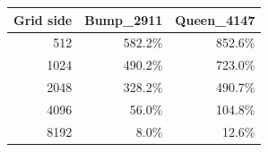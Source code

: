 \begin{tabular}{rrr}
\toprule
Grid side & Bump\_2911 & Queen\_4147\\
\midrule
512 & 582.2\% & 852.6\%\\
1024 & 490.2\% & 723.0\%\\
2048 & 328.2\% & 490.7\%\\
4096 & 56.0\% & 104.8\%\\
8192 & 8.0\% & 12.6\%\\
\bottomrule
\end{tabular}
